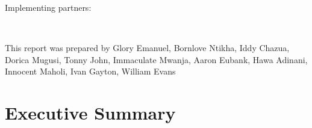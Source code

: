 \documentclass[a4paper,12pt,twoside]{article}
\begin{document}
\bigskip \medskip
{ } { } { } { } { } { } Implementing partners: 
\begin{center}
 { } { } { } { } { }

\

 { } { } 
 { } { }
\end{center}
\bigskip
This report was prepared by Glory Emanuel, Bornlove Ntikha, Iddy Chazua, Dorica Mugusi, Tonny John, Immaculate Mwanja, Aaron Eubank, Hawa Adinani, Innocent Maholi, Ivan Gayton, William Evans


    




\newpage
\tableofcontents

\newpage
\section{Executive Summary}
\end{document}
